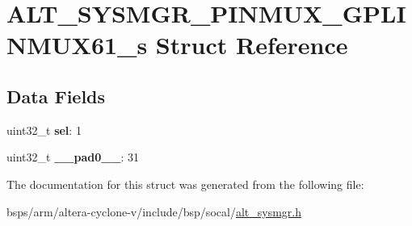 \hypertarget{structALT__SYSMGR__PINMUX__GPLINMUX61__s}{}\section{A\+L\+T\+\_\+\+S\+Y\+S\+M\+G\+R\+\_\+\+P\+I\+N\+M\+U\+X\+\_\+\+G\+P\+L\+I\+N\+M\+U\+X61\+\_\+s Struct Reference}
\label{structALT__SYSMGR__PINMUX__GPLINMUX61__s}
\subsection*{Data Fields}
\begin{DoxyCompactItemize}
\item 
\mbox{\label{structALT__SYSMGR__PINMUX__GPLINMUX61__s_a3c83a11f93469013b1678e32399a3083}} 
uint32\+\_\+t {\bfseries sel}\+: 1
\item 
\mbox{\label{structALT__SYSMGR__PINMUX__GPLINMUX61__s_a805ae4dacd423d3144e806dda6916150}} 
uint32\+\_\+t {\bfseries \+\_\+\+\_\+pad0\+\_\+\+\_\+}\+: 31
\end{DoxyCompactItemize}


The documentation for this struct was generated from the following file\+:\begin{DoxyCompactItemize}
\item 
bsps/arm/altera-\/cyclone-\/v/include/bsp/socal/\mbox{\hyperlink{alt__sysmgr_8h}{alt\+\_\+sysmgr.\+h}}\end{DoxyCompactItemize}
